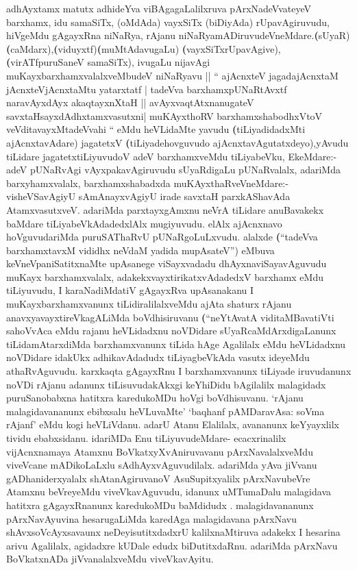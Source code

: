 \begin{artha}
adhAyxtamx matutx adhideYva viBAgagaLalilxruva
pArxNadeVvateyeV barxhamx, idu samaSiTx, (oMdAda) vayxSiTx (biDiyAda)
rUpavAgiruvudu, hiVgeMdu gAgayxRna niNaRya, rAjanu
niNaRyamADiruvudeVneMdare.\textbf(sUyaR)
\textbf(caMdarx),\textbf(viduyxtf)\textbf(muMtAdavugaLu)
\textbf(vayxSiTxrUpavAgive),\textbf(virATfpuruSaneV samaSiTx), ivugaLu
nijavAgi muKayxbarxhamxvalalxveMbudeV niNaRyavu || `` ajAcnxteV
jagadajAcnxtaM jAcnxteVjAcnxtaMtu yatarxtatf | tadeVva
barxhamxpUNaRtAvxtf naravAyxdAyx akaqtayxnXtaH ||
avAyxvaqtAtxnanugateV savxtaHsayxdAdhxtamxvasutxni| muKAyxthoRV
barxhamxshabodhxVtoV veVditavayxMtadeVvahi `` eMdu heVLidaMte yavudu
\textbf(tiLiyadidadxMti ajAcnxtavAdare) jagatetxV \textbf(tiLiyadehovguvudo
ajAcnxtavAgutatxdeyo),yAvudu tiLidare jagatetxtiLiyuvudoV adeV
barxhamxveMdu tiLiyabeVku, EkeMdare:- adeV pUNaRvAgi
vAyxpakavAgiruvudu sUyaRdigaLu pUNaRvalalx, adariMda barxyhamxvalalx,
barxhamxshabadxda muKAyxthaRveVneMdare:- visheVSavAgiyU sAmAnayxvAgiyU
irade savxtaH parxkAShavAda AtamxvasutxveV. adariMda parxtayxgAmxnu
neVrA tiLidare anuBavakekx baMdare tiLiyabeVkAdadedxlAlx
mugiyuvudu. elAlx ajAcnxnavo hoVguvudariMda puruSAThaRvU
pUNaRgoLuLxvudu. alalxde \textbf(``tadeVva barxhamxtavxM vididhx
neVdaM yadida mupAsateV'') eMbuva keVneVpaniSatitxnaMte upAsanege
viSayxvadadu dhAyxnaviSayavAguvudu muKayx barxhamxvalalx,
adakekxvayxtirikatxvAdadedxV barxhamx eMdu tiLiyuvudu, I
karaNadiMdatiV gAgayxRva upAsanakanu I muKayxbarxhamxvanunx
tiLidiralilalxveMdu ajAta shaturx rAjanu anavxyavayxtireVkagALiMda
boVdhisiruvanu \textbf(``neYtAvatA viditaMBavatiVti sahoVvAca eMdu
rajanu heVLidadxnu noVDidare sUyaRcaMdArxdigaLanunx tiLidamAtarxdiMda
barxhamxvanunx tiLida hAge Agalilalx eMdu heVLidadxnu noVDidare
idakUkx adhikavAdadudx tiLiyagbeVkAda vasutx ideyeMdu athaRvAguvudu.
karxkaqta gAgayxRnu I barxhamxvanunx tiLiyade iruvudanunx noVDi
rAjanu adanunx tiLisuvudakAkxgi keYhiDidu bAgilalilx malagidadx
puruSanobabxna hatitxra karedukoMDu hoVgi boVdhisuvanu. `rAjanu
malagidavananunx ebibxsalu heVLuvaMte' `baqhanf pAMDaravAsa: soVma
rAjanf' eMdu kogi heVLiVdanu. adarU Atanu Elalilalx, avananunx
keYyayxlilx tividu ebabxsidanu. idariMDa Enu tiLiyuvudeMdare-
ecacxrinalilx vijAcnxnamaya Atamxnu BoVkatxyXvAniruvavanu
pArxNavalalxveMdu viveVcane mADikoLaLxlu sAdhAyxvAguvudilalx. adariMda
yAva jiVvanu gADhaniderxyalalx shAtanAgiruvanoV AsuSupitxyalilx
pArxNavubeVre Atamxnu beVreyeMdu viveVkavAguvudu, idanunx uMTumaDalu
malagidava hatitxra  gAgayxRnanunx karedukoMDu baMdidudx
. malagidavananunx pArxNavAyuvina hesarugaLiMda karedAga malagidavana
pArxNavu shAvxsoVcAyxsavaunx neDeyisutitxdadxrU kalilxnaMtiruva
adakekx I hesarina arivu Agalilalx, agidadxre kUDale edudx
biDutitxdaRnu. adariMda pArxNavu BoVkatxnADa jiVvanalalxveMdu
viveVkavAyitu.
\end{artha}

